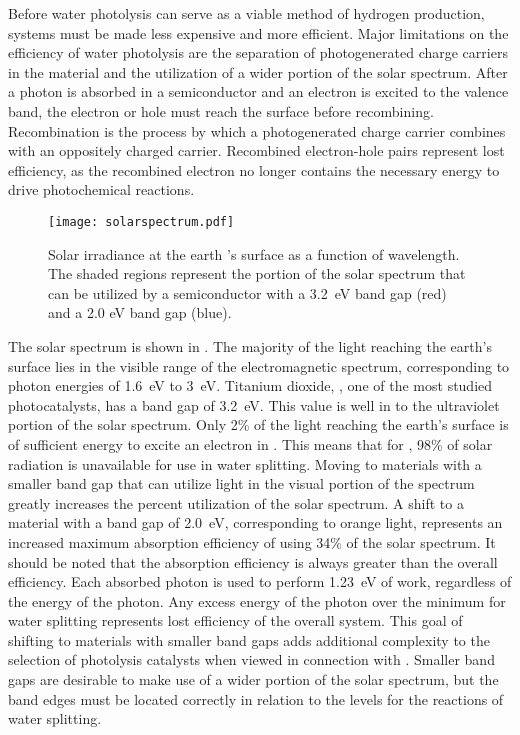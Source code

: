 Before water photolysis can serve as a viable method of hydrogen production, systems must be made less expensive and more efficient. Major limitations on the efficiency of water photolysis are the separation of photogenerated charge carriers in the material and the utilization of a wider portion of the solar spectrum. After a photon is absorbed in a semiconductor and an electron is excited to the valence band, the electron or hole must reach the surface before recombining. Recombination is the process by which a photogenerated charge carrier combines with an oppositely charged carrier. Recombined electron-hole pairs represent lost efficiency, as the recombined electron no longer contains the necessary energy to drive photochemical reactions. 



\begin{figure}
	\texttt{[image: solarspectrum.pdf]}
	\caption[Solar irradiance at the earth 's surface]{%
		Solar irradiance at the earth 's surface as a function of 
		wavelength. The shaded regions represent the portion of the 
		solar spectrum that can be utilized by a semiconductor with a 
		3.2~eV band gap (red) and a 2.0 eV band gap (blue).\cite{Anonymous:jk}}
	\label{fig:solarspectrum}
\end{figure}

The solar spectrum is shown in . The majority of the light reaching the earth's surface lies in the visible range of the electromagnetic spectrum, corresponding to photon energies of 1.6~eV to 3~eV. Titanium dioxide, , one of the most studied photocatalysts, has a band gap of 3.2~eV. This value is well in to the ultraviolet portion of the solar spectrum. Only 2\% of the light reaching the earth's surface is of sufficient energy to excite an electron in . This means that for , 98\% of solar radiation is unavailable for use in water splitting. Moving to materials with a smaller band gap that can utilize light in the visual portion of the spectrum greatly increases the percent utilization of the solar spectrum. A shift to a material with a band gap of 2.0~eV, corresponding to orange light, represents an increased maximum absorption efficiency of using 34\% of the solar spectrum. It should be noted that the absorption efficiency is always greater than the overall efficiency. Each absorbed photon is used to perform 1.23~eV of work, regardless of the energy of the photon. Any excess energy of the photon over the minimum for water splitting represents lost efficiency of the overall system. This goal of shifting to materials with smaller band gaps adds additional complexity to the selection of photolysis catalysts when viewed in connection with . Smaller band gaps are desirable to make use of a wider portion of the solar spectrum, but the band edges must be located correctly in relation to the levels for the reactions of water splitting.

